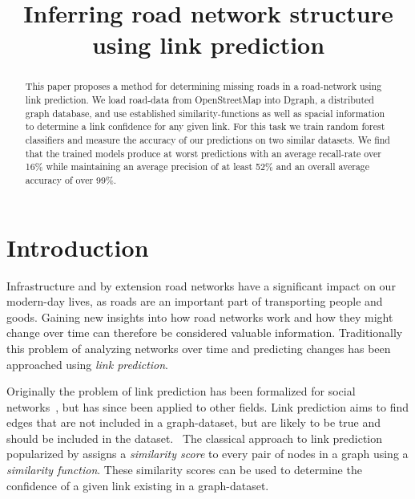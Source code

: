 \documentclass[12pt,a4paper]{IEEEtran}
\title{Inferring road network structure using link prediction}
\author{\IEEEauthorblockN{Ovidiu Victor T\u{a}tar}}
\date{\origdate\printdate{26.09.2020}}
\begin{document}
\maketitle

\begin{abstract}
This paper proposes a method for determining missing roads in a road-network using link prediction.
We load road-data from OpenStreetMap into Dgraph, a distributed graph database, and
use established similarity-functions as well as spacial information to determine
a link confidence for any given link.
For this task we train random forest classifiers and measure the accuracy of our predictions
on two similar datasets.
We find that the trained models produce at worst predictions with an average recall-rate over 16\%
while maintaining an average precision of at least 52\% and an overall average accuracy of over 99\%.
\end{abstract}

\IEEEpeerreviewmaketitle

\section{Introduction}

Infrastructure and by extension road networks have a significant impact on our
modern-day lives, as roads are an important part of transporting people and goods.
Gaining new insights into how road networks work and how they might change over time
can therefore be considered valuable information.
Traditionally this problem of analyzing networks over time and predicting changes has been approached using \emph{link prediction}.

Originally the problem of link prediction has been formalized for social networks~\cite[see][]{social_link_prediction},
but has since been applied to other fields.
Link prediction aims to find edges that are not included in a graph-dataset,
but are likely to be true and should be included in the dataset.~\cite[see][61]{knowledge_graphs}
The classical approach to link prediction popularized by \citeauthor{social_link_prediction} assigns a \emph{similarity score}
to every pair of nodes in a graph using a \emph{similarity function}.
These similarity scores can be used to determine the confidence of a given link existing in a graph-dataset.
\end{document}
